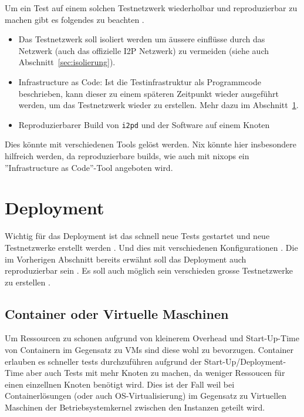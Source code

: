 Um ein Test auf einem solchen Testnetzwerk wiederholbar und reproduzierbar zu machen gibt es folgendes zu beachten .

\begin{itemize}
    \item Das Testnetzwerk soll isoliert werden um äussere einflüsse durch das Netzwerk (auch das offizielle I2P Netzwerk) zu vermeiden (siehe auch Abschnitt~\ref{sec:isolierung}).
    \item Infrastructure as Code: Ist die Testinfrastruktur als Programmcode beschrieben, kann dieser zu einem späteren Zeitpunkt wieder ausgeführt werden, um das Testnetzwerk wieder zu erstellen. Mehr dazu im Abschnitt~\ref{sec:deployment}.
    \item Reproduzierbarer Build von \lstinline|i2pd| und der Software auf einem Knoten
\end{itemize}

Dies könnte mit verschiedenen Tools gelöst werden. Nix könnte hier insbesondere hilfreich werden, da reproduzierbare builds, wie auch mit nixops ein ''Infrastructure as Code''-Tool angeboten wird.

\section{Deployment}\label{sec:deployment}

Wichtig für das Deployment ist das schnell neue Tests gestartet und neue Testnetzwerke erstellt werden .
Und dies mit verschiedenen Konfigurationen .
Die im Vorherigen Abschnitt bereits erwähnt soll das Deployment auch reproduzierbar sein .
Es soll auch möglich sein verschieden grosse Testnetzwerke zu erstellen .



\subsection{Container oder Virtuelle Maschinen}

Um Ressourcen zu schonen aufgrund von kleinerem Overhead und Start-Up-Time von Containern im Gegensatz zu VMs sind diese wohl zu bevorzugen.
Container erlauben es schneller tests durchzuführen  aufgrund der Start-Up/Deployment-Time
aber auch Tests mit mehr Knoten zu machen, da weniger Ressoucen für einen einzellnen Knoten benötigt wird.
Dies ist der Fall weil bei Containerlösungen (oder auch OS-Virtualisierung) im Gegensatz zu Virtuellen Maschinen der Betriebsystemkernel zwischen den Instanzen geteilt wird.

